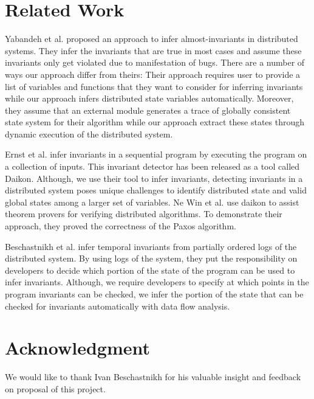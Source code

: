 
\section{Related Work}

Yabandeh et al.\cite{yabandeh2011finding} proposed an approach to
infer almost-invariants in distributed systems. They infer the
invariants that are true in most cases and assume these invariants
only get violated due to manifestation of bugs. There are a number of
ways our approach differ from theirs: Their approach requires user to
provide a list of variables and functions that they want to consider
for inferring invariants while our approach infers distributed state
variables automatically. Moreover, they assume that an external module
generates a trace of globally consistent state system for their
algorithm while our approach extract these states through dynamic
execution of the distributed system.

Ernst et al.\cite{ernst2001dynamically} infer invariants in a
sequential program by executing the program on a collection of inputs.
This invariant detector has been released as a tool called
Daikon\cite{ernst2007daikon}. Although, we use their tool to infer
invariants, detecting invariants in a distributed system poses unique
challenges to identify distributed state and valid global states among
a larger set of variables. Ne Win et al.\cite{NeWinEGKL04} use daikon
to assist theorem provers for verifying distributed algorithms. To
demonstrate their approach, they proved the correctness of the Paxos
algorithm.

Beschastnikh et al. \cite{temporalInv} infer temporal invariants from partially ordered logs of the distributed system. By using logs of the system, they put the responsibility on developers to decide which portion of the state of the program can be used to infer invariants. Although, we require developers to specify at which points in the program invariants can be checked, we infer the portion of the state that can be checked for invariants automatically with data flow analysis.


\section{Acknowledgment}
We would like to thank Ivan Beschastnikh for his valuable insight and feedback on proposal of this project.